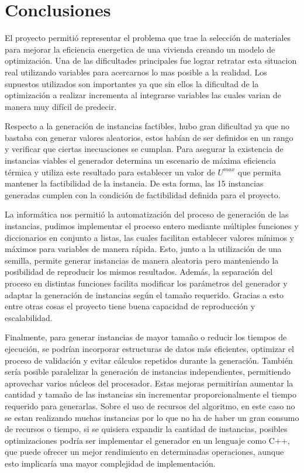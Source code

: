 
\section{Conclusiones}
El proyecto permitió representar el problema que trae la selección de materiales para mejorar la eficiencia energetica de una vivienda creando un modelo de optimización. Una de las dificultades principales fue lograr retratar esta situacion real utilizando variables para acercarnos lo mas posible a la realidad. Los supuestos utilizados son importantes ya que sin ellos la dificultad de la optimización a realizar incrementa al integrarse variables las cuales varian de manera muy difícil de predecir.

Respecto a la generación de instancias factibles, hubo gran dificultad ya que no bastaba con generar valores aleatorios, estos habían de ser definidos en un rango y verificar que ciertas inecuaciones se cumplan. Para asegurar la existencia de instancias viables el generador determina un escenario de máxima eficiencia térmica y utiliza este resultado para establecer un valor de $U^{max}$ que permita mantener la factibilidad de la instancia. De esta forma, las 15 instancias generadas cumplen con la condición de factibilidad definida para el proyecto.

La informática nos permitió la automatización del proceso de generación de las instancias, pudimos implementar el proceso entero mediante múltiples funciones y diccionarios en conjunto a listas, las cuales facilitan establecer valores mínimos y máximos para variables de manera rápida. Esto, junto a la utilización de una semilla, permite generar instancias de manera aleatoria pero manteniendo la posibilidad de reproducir los mismos resultados. Además, la separación del proceso en distintas funciones facilita modificar los parámetros del generador y adaptar la generación de instancias según el tamaño requerido. Gracias a esto entre otras cosas el proyecto tiene buena capacidad de reproducción y escalabilidad.

Finalmente, para generar instancias de mayor tamaño o reducir los tiempos de ejecución, se podrían incorporar estructuras de datos más eficientes, optimizar el proceso de validación y evitar cálculos repetidos durante la generación. También sería posible paralelizar la generación de instancias independientes, permitiendo aprovechar varios núcleos del procesador. Estas mejoras permitirían aumentar la cantidad y tamaño de las instancias sin incrementar proporcionalmente el tiempo requerido para generarlas. Sobre el uso de recursos del algoritmo, en este caso no se estan realizando muchas instancias por lo que no ha de haber un gran consumo de recursos o tiempo, si se quisiera expandir la cantidad de instancias, posibles optimizaciones podría ser implementar el generador en un lenguaje como C++, que puede ofrecer un mejor rendimiento en determinadas operaciones, aunque esto implicaría una mayor complejidad de implementación.

